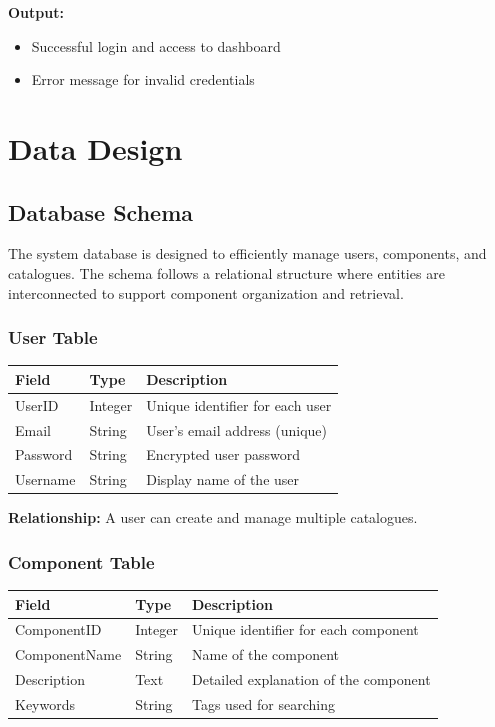 \documentclass[12pt]{scrreprt}
\begin{document}
\textbf{Output:}
\begin{itemize}
    \item Successful login and access to dashboard
    \item Error message for invalid credentials
\end{itemize}

\chapter{Data Design}

\section{Database Schema}

The system database is designed to efficiently manage users, components, and catalogues. The schema follows a relational structure where entities are interconnected to support component organization and retrieval.

\subsection{User Table}

\begin{longtable}{|p{3cm}|p{3cm}|p{7cm}|}
\hline
\textbf{Field} & \textbf{Type} & \textbf{Description} \\
\hline
UserID & Integer & Unique identifier for each user \\
Email & String & User's email address (unique) \\
Password & String & Encrypted user password \\
Username & String & Display name of the user \\
\hline
\end{longtable}

\textbf{Relationship:} A user can create and manage multiple catalogues.

\vspace{0.5cm}

\subsection{Component Table}

\begin{longtable}{|p{3cm}|p{3cm}|p{7cm}|}
\hline
\textbf{Field} & \textbf{Type} & \textbf{Description} \\
\hline
ComponentID & Integer & Unique identifier for each component \\
ComponentName & String & Name of the component \\
Description & Text & Detailed explanation of the component \\
Keywords & String & Tags used for searching \\
\hline
\end{longtable}
\end{document}
